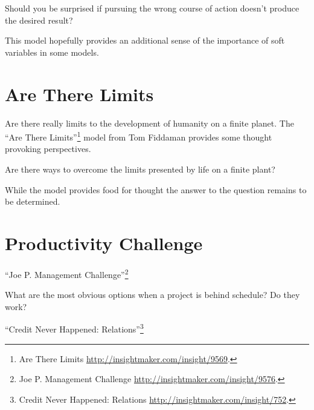\documentclass[]{memoir}
\begin{document}
\FloatBarrier 

\begin{model}[frametitle={Model: Managing Time in Time Management}] 

 Should you be surprised if pursuing the wrong course of action doesn't produce the desired result?




 \end{model}

This model hopefully provides an additional sense of the importance of
soft variables in some models.

\section{Are There Limits}

Are there really limits to the development of humanity on a finite
planet. The ``Are There Limits''\footnote{Are There Limits
  \url{http://insightmaker.com/insight/9569}.} model from Tom Fiddaman
provides some thought provoking perspectives.

\FloatBarrier 

\begin{model}[frametitle={Model: Are There Limits}] 

 Are there ways to overcome the limits presented by life on a finite plant?




 \end{model}

While the model provides food for thought the answer to the question
remains to be determined.

\section{Productivity Challenge}

``Joe P. Management Challenge''\footnote{Joe P. Management Challenge
  \url{http://insightmaker.com/insight/9576}.}

\FloatBarrier 

\begin{model}[frametitle={Model: Joe P. Management Challenge}] 

 What are the most obvious options when a project is behind schedule? Do they work?




 \end{model}

``Credit Never Happened: Relations''\footnote{Credit Never Happened:
  Relations \url{http://insightmaker.com/insight/752}.}
\end{document}
